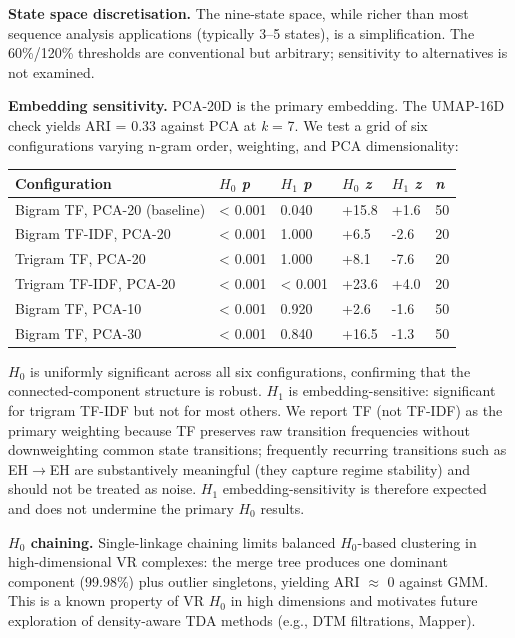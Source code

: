 \textbf{State space discretisation.} The nine-state space, while richer than most sequence analysis applications (typically 3--5 states), is a simplification. The 60\%/120\% thresholds are conventional but arbitrary; sensitivity to alternatives is not examined.

\textbf{Embedding sensitivity.} PCA-20D is the primary embedding. The UMAP-16D check yields ARI = 0.33 against PCA at \textit{k} = 7. We test a grid of six configurations varying n-gram order, weighting, and PCA dimensionality:

\begin{tabular}{llllll}
\toprule
Configuration & $H_0$ \textit{p} & $H_1$ \textit{p} & $H_0$ \textit{z} & $H_1$ \textit{z} & \textit{n} \\
\midrule
Bigram TF, PCA-20 (baseline) & < 0.001 & 0.040 & +15.8 & +1.6 & 50 \\
Bigram TF-IDF, PCA-20 & < 0.001 & 1.000 & +6.5 & -2.6 & 20 \\
Trigram TF, PCA-20 & < 0.001 & 1.000 & +8.1 & -7.6 & 20 \\
Trigram TF-IDF, PCA-20 & < 0.001 & < 0.001 & +23.6 & +4.0 & 20 \\
Bigram TF, PCA-10 & < 0.001 & 0.920 & +2.6 & -1.6 & 50 \\
Bigram TF, PCA-30 & < 0.001 & 0.840 & +16.5 & -1.3 & 50 \\
\bottomrule
\end{tabular}

$H_0$ is uniformly significant across all six configurations, confirming that the connected-component structure is robust. $H_1$ is embedding-sensitive: significant for trigram TF-IDF but not for most others. We report TF (not TF-IDF) as the primary weighting because TF preserves raw transition frequencies without downweighting common state transitions; frequently recurring transitions such as EH$\to$EH are substantively meaningful (they capture regime stability) and should not be treated as noise. $H_1$ embedding-sensitivity is therefore expected and does not undermine the primary $H_0$ results.

\textbf{$H_0$ chaining.} Single-linkage chaining limits balanced $H_0$-based clustering in high-dimensional VR complexes: the merge tree produces one dominant component (99.98\%) plus outlier singletons, yielding ARI $\approx$ 0 against GMM. This is a known property of VR $H_0$ in high dimensions \citep{bobrowski2018topology} and motivates future exploration of density-aware TDA methods (e.g., DTM filtrations, Mapper).


